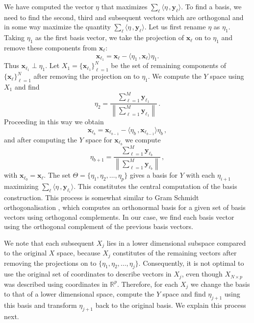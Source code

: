 \documentclass[letter,12pt]{article}
\begin{document}
We have computed the vector $\eta$ that maximizes $\sum_{\ell}\langle \eta\, , \bm{y}_{\ell}\rangle$. To find a basis, we need to find the second, third and subsequent vectors which are orthogonal and in some way maximize the quantity $\sum_{\ell}\langle \eta\, , \bm{y}_{\ell}\rangle$. Let us first rename $\eta$ as $\eta_1$. {\color{blue} Taking $\eta_1$ as the first basis vector, we take the projection of $\bm{x}_\ell$ on to $\eta_1$ and remove these components from $\bm{x}_\ell$: 
\begin{equation}\label{eq:secMF10}
	\bm{x}_{\ell_1} = \bm{x}_\ell - \langle \eta_1 \, , \bm{x}_\ell \rangle \eta_1.
\end{equation}
Thus $\bm{x}_{\ell_1} \perp \eta_1$. Let $X_1 = \{\bm{x}_{\ell_1} \}_{\ell=1}^N $ be the set of remaining components of $\{ \bm{x}_\ell \}_{\ell=1}^N$ after removing the projection on to $\eta_1$. We compute the $Y$ space using $X_1$ and find  
\begin{equation}\label{eq:secMF111st}
	\eta_2 = \frac{\sum_{\ell=1}^M \bm{y}_{\ell_1} }{ \left\lVert\sum_{\ell=1}^M \bm{y}_{\ell_1} \right\rVert }\,.
\end{equation}
Proceeding in this way we obtain
\begin{equation}\label{eq:secMF12}
	\bm{x}_{\ell_{b}}  = \bm{x}_{\ell_{b-1}} - \langle \eta_b \, , \bm{x}_{\ell_{b-1}} \rangle \eta_b \, ,
\end{equation} 
and after computing the $Y$ space for $\bm{x}_{\ell_{b}}$ we compute
\begin{equation}\label{eq:secMF13}
    \eta_{b+1}  = \frac{\sum_{\ell=1}^M \bm{y}_{\ell_b} }{ \left\lVert\sum_{\ell=1}^M \bm{y}_{\ell_b} \right\rVert } \, ,
\end{equation}
with $\bm{x}_{\ell_0} = \bm{x}_{\ell}$. } The set $\Theta = \{ \eta_1, \eta_2, \dots , \eta_p \}$ gives a basis for $Y$ with each $\eta_{i+1}$ maximizing $\sum_{\ell}\langle \eta\, , \bm{y}_{\ell_i} \rangle$.
{\color{blue} This constitutes the central computation of the basis construction.}  This process is somewhat similar to Gram Schmidt orthogonalisation { \color{blue} \citep{anton2013elementary}, which computes an orthonormal basis for a  given set of basis vectors using orthogonal complements. In our case, we find each basis vector using the orthogonal complement of the previous basis vectors.  }

{\color{blue}
We note that each subsequent $X_j$ lies in a lower dimensional subspace compared to the original $X$ space, because $X_j$ constitutes of the remaining vectors after removing the projections on to $\{ \eta_1, \eta_2, \ldots , \eta_{j} \}$. Consequently, it is not optimal to use the original set of coordinates to describe vectors in $X_j$,  even though $X_{N \times p}$ was described using coordinates in $\mathbb{R}^p$. Therefore, for each $X_j$ we change the basis to that of a lower dimensional space, compute the $Y$ space and find $\eta_{j+1}$ using this basis and transform $\eta_{j+1}$ back to the original basis. We explain this process next.  

}
\end{document}
